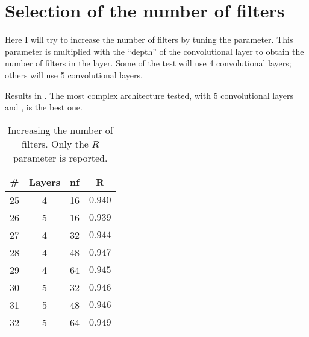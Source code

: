 \section{Selection of the number of filters}\label{sec:cnnfilters}

Here I will try to increase the number of filters by tuning the 
parameter. This parameter is multiplied with the ``depth'' of the convolutional
layer to obtain the number of filters in the layer. Some of the test will use 4
convolutional layers; others will use 5 convolutional layers.

Results in . The most complex architecture tested,
with 5 convolutional layers and , is the best one.

\begin{table}[hbtp]
	\centering
	\begin{tabular}{|c|c|c|c|}
		\toprule
		\# & Layers & nf & R \\
		\midrule
		25 & 4 & 16 & \(0.940\) \\
		26 & 5 & 16 & \(0.939\) \\
		27 & 4 & 32 & \(0.944\) \\
		28 & 4 & 48 & \(0.947\) \\
		29 & 4 & 64 & \(0.945\) \\
		30 & 5 & 32 & \(0.946\) \\
		31 & 5 & 48 & \(0.946\) \\
		32 & 5 & 64 & \(0.949\) \\
		\bottomrule
	\end{tabular}
	\caption{Increasing the number of filters. Only the \(R\) parameter is
	reported.}\label{table:cnnfilters}
\end{table}
